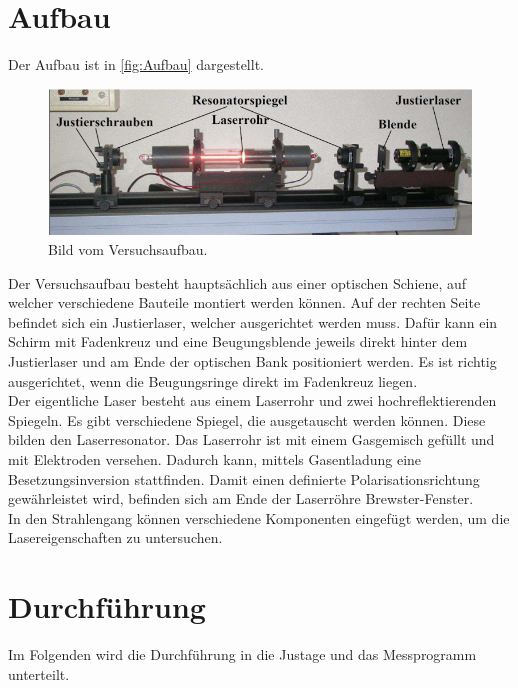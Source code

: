 \section{Aufbau}
\label{sec:Aufbau}
Der Aufbau ist in \autoref{fig:Aufbau} dargestellt.
\begin{figure}[H]
    \centering
    \includegraphics[scale=0.7]{Abbildungen/Aufbau.png}
    \caption{Bild vom Versuchsaufbau.\cite{V61}}
    \label{fig:Aufbau}
\end{figure}
Der Versuchsaufbau besteht hauptsächlich aus einer optischen Schiene, auf welcher verschiedene Bauteile montiert werden können.
Auf der rechten Seite befindet sich ein Justierlaser, welcher ausgerichtet werden muss. Dafür kann ein Schirm mit Fadenkreuz und eine Beugungsblende
jeweils direkt hinter dem Justierlaser und am Ende der optischen Bank positioniert werden. Es ist richtig ausgerichtet, wenn die 
Beugungsringe direkt im Fadenkreuz liegen.\\
Der eigentliche Laser besteht aus einem Laserrohr und zwei hochreflektierenden Spiegeln.
Es gibt verschiedene Spiegel, die ausgetauscht werden können. Diese bilden den Laserresonator.
Das Laserrohr ist mit einem Gasgemisch gefüllt und mit Elektroden versehen. Dadurch kann, mittels Gasentladung eine Besetzungsinversion stattfinden.
Damit einen definierte Polarisationsrichtung gewährleistet wird, befinden sich am Ende der Laserröhre Brewster-Fenster.\\
In den Strahlengang können verschiedene Komponenten eingefügt werden, um die Lasereigenschaften zu untersuchen.

\section{Durchführung}
\label{sec:Durchführung}
Im Folgenden wird die Durchführung in die Justage und das Messprogramm unterteilt.

